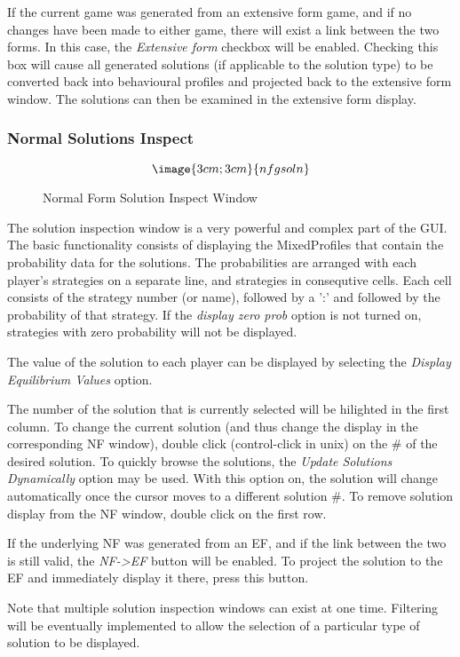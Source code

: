 If the current game was generated from an extensive form game, and if no
changes have been made to either game, there will exist a link between the
two forms.  In this case, the {\em Extensive form} checkbox will be
enabled.  Checking this box will cause all generated solutions (if
applicable to the solution type) to be converted back into behavioural
profiles and projected back to the extensive form window.  The solutions
can then be examined in the extensive form display.


\subsubsection{Normal Solutions Inspect}\label{NormalSolutionInspect}
\begin{figure}
$$\image{3cm;3cm}{nfgsoln}$$
\caption{Normal Form Solution Inspect Window}\label{fig:nfgsoln}
\end{figure}


The solution inspection window is a very powerful and complex part of the GUI.
The basic functionality consists of displaying the MixedProfiles that contain the
probability data for the solutions.  The probabilities are arranged with each 
player's strategies on a separate line, and strategies in consequtive cells.  
Each cell consists of the strategy number (or name), followed by a ':' and followed
by the probability of that strategy.
If the {\em display zero prob} option is not turned on, strategies with zero probability
will not be displayed. 

The value of the solution to each player can be displayed by selecting the 
{\em Display Equilibrium Values} option.

The number of the solution that is currently selected will be hilighted in the first
column.  To change the current solution (and thus change the display in the 
corresponding NF window), double click (control-click in unix) on the \# of the
desired solution.  To quickly browse the solutions, the {\em Update Solutions Dynamically}
option may be used.  With this option on, the solution will change automatically once
the cursor moves to a different solution \#.  To remove solution display from the NF window,
double click on the first row.

If the underlying NF was generated from an EF, and if the link between the two is still
valid, the {\em NF->EF} button will be enabled.  To project the solution to the EF and
immediately display it there, press this button.

Note that multiple solution inspection windows can exist at one time.  Filtering will
be eventually implemented to allow the selection of a particular type of solution to
be displayed.

